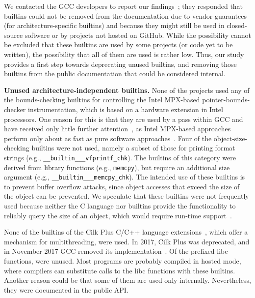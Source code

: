 \documentclass[sigconf,screen]{acmart}
\renewcommand{\paragraph}[1]{\textbf{#1}}
\newcommand\code[1]{\texttt{#1}}
\begin{document}
We contacted the GCC developers to report our findings~\cite{gccdevs};
they responded that builtins could not be removed from the documentation due to vendor guarantees (for architecture-specific builtins) and because they might still be used in closed-source software or by projects not hosted on GitHub.
While the possibility cannot be excluded that these builtins are used by some projects (or code yet to be written), the possibility that all of them are used is rather low.
Thus, our study provides a first step towards deprecating unused builtins, and removing those builtins from the public documentation that could be considered internal.

\paragraph{Unused architecture-independent builtins.}
None of the projects used any of the \nrUnusedbounds{} bounds-checking builtins for controlling the Intel MPX-based pointer-bounds-checker instrumentation, which is based on a hardware extension in Intel processors.
One reason for this is that they are used by a pass within GCC and have received only little further attention~\cite{rigger2018context}, as Intel MPX-based approaches perform only about as fast as pure software approaches~\cite{intelmpx}.
Four of the object-size-checking builtins were not used, namely a subset of those for printing format strings (e.g., \code{\_\_builtin\_\_\_vfprintf\_chk}).
The builtins of this category were derived from library functions (e.g., \code{memcpy}), but require an additional size argument (e.g., \code{\_\_builtin\_\_\_memcpy\_chk}).
The intended use of these builtins is to prevent buffer overflow attacks, since object accesses that exceed the size of the object can be prevented.
We speculate that these builtins were not frequently used because neither the C language nor builtins provide the functionality to reliably query the size of an object, which would require run-time support~\cite{introspection}.

None of the \nrUnusedcilk{} builtins of the Cilk Plus C/C++ language extensions~\cite{cilkplusplus}, which offer a mechanism for multithreading, were used.
In 2017, Cilk Plus was deprecated, and in November 2017 GCC removed its implementation~\cite{cilkremove}.
Of the prefixed libc functions, \percentageUnusedotherlibc{} were unused.
Most programs are probably compiled in hosted mode, where compilers
can substitute calls to the libc functions with these builtins.
Another reason could be that some of them are used only internally.
Nevertheless, they were documented in the public API.
\end{document}

